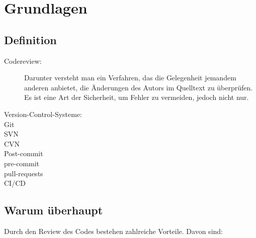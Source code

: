 \section{Grundlagen}
\label{sec:Grundlagen}

\subsection{Definition}
\label{subsec:Definition}

\begin{description}
	\item [Codereview:] \hfill
		Darunter versteht man ein Verfahren, das die Gelegenheit jemandem anderen anbietet, die Änderungen des Autors im Quelltext zu überprüfen. Es ist eine Art der Sicherheit, um 				Fehler zu vermeiden, jedoch nicht nur.

	\item [Version-Control-Systeme:] \hfill

	\item [Git] \hfill
	
	\item [SVN]
	
	\item [CVN]
	
	\item [Post-commit] \hfill
	
	\item [pre-commit] \hfill
		
	\item [pull-requests] \hfill
	
	\item [\ac{CI}/\ac{CD}]
			
\end{description}

\subsection{Warum überhaupt}
\label{subsec:Gründe}
Durch den Review des Codes bestehen zahlreiche Vorteile. Davon sind:

